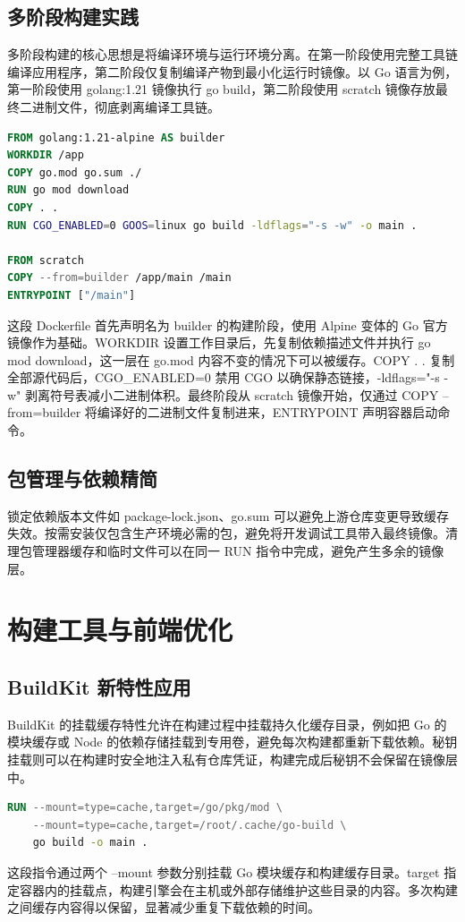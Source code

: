 \section{多阶段构建实践}
多阶段构建的核心思想是将编译环境与运行环境分离。在第一阶段使用完整工具链编译应用程序，第二阶段仅复制编译产物到最小化运行时镜像。以 Go 语言为例，第一阶段使用 golang:1.21 镜像执行 go build，第二阶段使用 scratch 镜像存放最终二进制文件，彻底剥离编译工具链。\par
\begin{lstlisting}[language=dockerfile]
FROM golang:1.21-alpine AS builder
WORKDIR /app
COPY go.mod go.sum ./
RUN go mod download
COPY . .
RUN CGO_ENABLED=0 GOOS=linux go build -ldflags="-s -w" -o main .

FROM scratch
COPY --from=builder /app/main /main
ENTRYPOINT ["/main"]
\end{lstlisting}
这段 Dockerfile 首先声明名为 builder 的构建阶段，使用 Alpine 变体的 Go 官方镜像作为基础。WORKDIR 设置工作目录后，先复制依赖描述文件并执行 go mod download，这一层在 go.mod 内容不变的情况下可以被缓存。COPY . . 复制全部源代码后，CGO\_{}ENABLED=0 禁用 CGO 以确保静态链接，-ldflags="-s -w" 剥离符号表减小二进制体积。最终阶段从 scratch 镜像开始，仅通过 COPY --from=builder 将编译好的二进制文件复制进来，ENTRYPOINT 声明容器启动命令。\par
\section{包管理与依赖精简}
锁定依赖版本文件如 package-lock.json、go.sum 可以避免上游仓库变更导致缓存失效。按需安装仅包含生产环境必需的包，避免将开发调试工具带入最终镜像。清理包管理器缓存和临时文件可以在同一 RUN 指令中完成，避免产生多余的镜像层。\par
\chapter{构建工具与前端优化}
\section{BuildKit 新特性应用}
BuildKit 的挂载缓存特性允许在构建过程中挂载持久化缓存目录，例如把 Go 的模块缓存或 Node 的依赖存储挂载到专用卷，避免每次构建都重新下载依赖。秘钥挂载则可以在构建时安全地注入私有仓库凭证，构建完成后秘钥不会保留在镜像层中。\par
\begin{lstlisting}[language=dockerfile]
RUN --mount=type=cache,target=/go/pkg/mod \
    --mount=type=cache,target=/root/.cache/go-build \
    go build -o main .
\end{lstlisting}
这段指令通过两个 --mount 参数分别挂载 Go 模块缓存和构建缓存目录。target 指定容器内的挂载点，构建引擎会在主机或外部存储维护这些目录的内容。多次构建之间缓存内容得以保留，显著减少重复下载依赖的时间。\par
